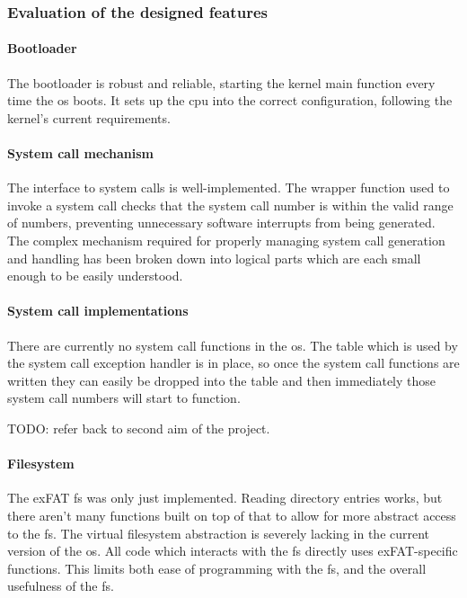 \documentclass{article}
\begin{document}
\subsubsection{Evaluation of the designed features}
\paragraph{Bootloader}
The bootloader is robust and reliable, starting the kernel main function every
time the \gls{os} boots. It sets up the \gls{cpu} into the correct
configuration, following the kernel's current requirements.

\paragraph{System call mechanism}
The interface to system calls is well-implemented. The wrapper function used to
invoke a system call checks that the system call number is within the valid
range of numbers, preventing unnecessary software interrupts from being
generated. The complex mechanism required for properly managing system call
generation and handling has been broken down into logical parts which are each
small enough to be easily understood.

\paragraph{System call implementations}
\label{sec:eval_no_syscalls}
There are currently no system call functions in the \gls{os}. The table which
is used by the system call exception handler is in place, so once the system
call functions are written they can easily be dropped into the table and then
immediately those system call numbers will start to function.

TODO: refer back to second aim of the project.

\paragraph{Filesystem}
The exFAT \gls{fs} was only just implemented. Reading directory entries works,
but there aren't many functions built on top of that to allow for more abstract
access to the \gls{fs}. The virtual filesystem abstraction is severely lacking
in the current version of the \gls{os}. All code which interacts with the
\gls{fs} directly uses exFAT-specific functions. This limits both ease of
programming with the \gls{fs}, and the overall usefulness of the \gls{fs}.
\end{document}
